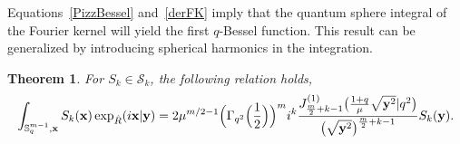 \documentclass[11pt]{article}
\newtheorem{theorem}{Theorem}
\newcommand{\mS}{\mathbb{S}}
\newcommand{\cS}{\mathcal{S}}
\numberwithin{equation}{section}
\begin{document}
Equations~\eqref{PizzBessel} and~\eqref{derFK} imply that the quantum sphere integral of the Fourier kernel will yield the f\/irst $q$-Bessel function. This result can be generalized by introducing spherical harmonics in the integration.

\begin{theorem}
\label{FHexp}
For $S_k\in\cS_k$, the following relation holds,
\begin{gather*}
\int_{\mS^{m-1}_q,\bold{x}}S_k(\bold{x})\exp_{\hat{R}}(i\bold{x}|\bold{y}) = 2\mu^{m/2-1} \Big(\Gamma_{q^2}\Big(\frac{1}{2}\Big)\Big)^{m}i^k\frac{J^{(1)}_{\frac{m}{2}+k-1}\big(\frac{1+q}{\mu}\sqrt{\bold{y}^2}|q^2\big)}
{\big(\sqrt{\bold{y}^2}\big)^{\frac{m}{2}+k-1}}S_k(\bold{y}).
\end{gather*}
\end{theorem}
\end{document}
